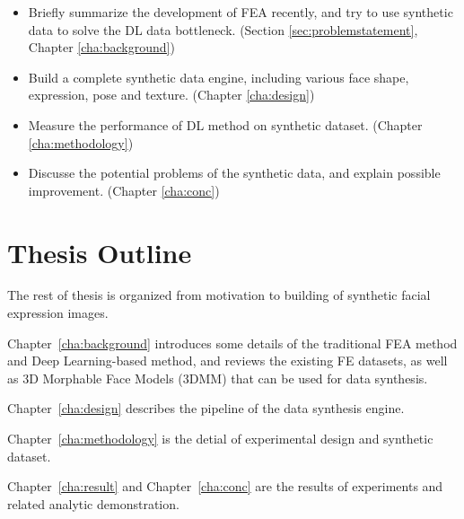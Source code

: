\begin{itemize}
    \item Briefly summarize the development of FEA recently, and try to use synthetic data to solve the DL data bottleneck. (Section \ref{sec:problemstatement}, Chapter \ref{cha:background})
    \item Build a complete synthetic data engine, including various face shape, expression, pose and texture. (Chapter \ref{cha:design})
    \item Measure the performance of DL method on synthetic dataset. (Chapter \ref{cha:methodology})
    \item Discusse the potential problems of the synthetic data, and explain  possible improvement. (Chapter \ref{cha:conc})
\end{itemize}

\section{Thesis Outline}
\label{sec:outline}
The rest of thesis is organized from motivation to building of synthetic facial expression images.

Chapter~\ref{cha:background} introduces some details of the traditional FEA method and Deep Learning-based method, and reviews the existing FE datasets, as well as 3D Morphable Face Models (3DMM) that can be used for data synthesis.

Chapter~\ref{cha:design} describes the pipeline of the data synthesis engine.

Chapter~\ref{cha:methodology} is the detial of experimental design  and synthetic dataset.

Chapter~\ref{cha:result} and Chapter~\ref{cha:conc} are the results of experiments and related analytic demonstration.


